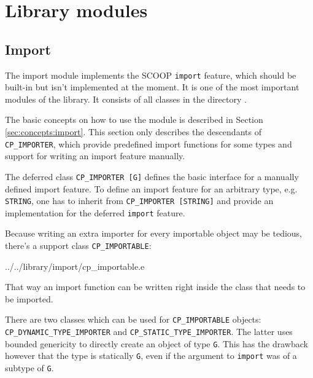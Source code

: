 \section{Library modules}
\label{sec:modules}

\subsection{Import}
\label{sec:modules:import}

The import module implements the SCOOP \lstinline!import! feature, which should be built-in but isn't implemented at the moment.
It is one of the most important modules of the library.
It consists of all classes in the directory .

The basic concepts on how to use the module is described in Section \ref{sec:concepts:import}.
This section only describes the descendants of \lstinline!CP_IMPORTER!, which provide predefined import functions for some types and support for writing an import feature manually.

The deferred class \lstinline!CP_IMPORTER [G]! defines the basic interface for a manually defined import feature.
To define an import feature for an arbitrary type, e.g. \lstinline!STRING!, one has to inherit from \lstinline!CP_IMPORTER [STRING]! and provide an implementation for the deferred \lstinline!import! feature.

% 

Because writing an extra importer for every importable object may be tedious, there's a support class \lstinline!CP_IMPORTABLE!:

 {../../library/import/cp_importable.e}

That way an import function can be written right inside the class that needs to be imported.

There are two classes which can be used for \lstinline!CP_IMPORTABLE! objects: \lstinline!CP_DYNAMIC_TYPE_IMPORTER! and \lstinline!CP_STATIC_TYPE_IMPORTER!.
The latter uses bounded genericity to directly create an object of type \lstinline!G!.
This has the drawback however that the type is statically \lstinline!G!, even if the argument to \lstinline!import! was of a subtype of \lstinline!G!.

